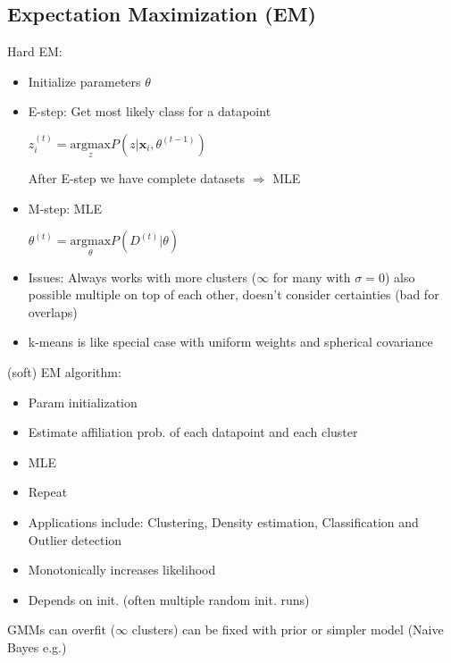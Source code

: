 \subsection{Expectation Maximization (EM)}

Hard EM:
\begin{itemize}
    \item Initialize parameters $\theta$
    \item E-step: Get most likely class for a datapoint
    
    $z_i^{(t)} = \underset{z}{\text{argmax}} P(z|\boldsymbol{x}_i,\theta^{(t-1)})$

    After E-step we have complete datasets $\Rightarrow$ MLE
    \item M-step: MLE

    $\theta^{(t)} = \underset{\theta}{\text{argmax}}P(D^{(t)}|\theta)$
    \item Issues: Always works with more clusters ($\infty$ for many with $\sigma = 0$) also possible multiple on top of each other, doesn't consider certainties (bad for overlaps)
    \item k-means is like special case with uniform weights and spherical covariance
\end{itemize}

(soft) EM algorithm:
\begin{itemize}
    \item Param initialization
    \item Estimate affiliation prob. of each datapoint and each cluster
    \item MLE
    \item Repeat
    \item Applications include: Clustering, Density estimation, Classification and Outlier detection
    \item Monotonically increases likelihood
    \item Depends on init. (often multiple random init. runs)
\end{itemize}

GMMs can overfit ($\infty$ clusters) can be fixed with prior or simpler model (Naive Bayes e.g.)


